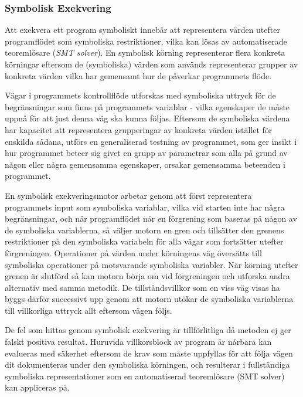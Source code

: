 \subsubsection{Symbolisk Exekvering}

Att exekvera ett program symboliskt innebär att representera värden utefter 
programflödet som symboliska restriktioner, vilka kan lösas av automatiserade 
teoremlösare (\emph{SMT solver}). En symbolisk körning representerar flera konkreta 
körningar eftersom de (symboliska) värden som används representerar grupper av 
konkreta värden vilka har gemensamt hur de påverkar programmets flöde. 

Vägar i programmets kontrollflöde utforskas med symboliska uttryck för de 
begränsningar som finns på programmets variablar - vilka egenskaper de måste uppnå 
för att just denna väg ska kunna följas. Eftersom de symboliska värdena har kapacitet 
att representera grupperingar av konkreta värden istället för enskilda sådana, 
utförs en generaliserad testning av programmet, som ger insikt i hur programmet 
beteer sig givet en grupp av parametrar som alla på grund av någon eller några 
gemensamma egenskaper, orsakar gemensamma beteenden i programmet. 

En symbolisk exekveringsmotor arbetar genom att först representera programmets input 
som symboliska variablar, vilka vid starten inte har några begränsningar, och när 
programflödet når en förgrening som baseras på någon av de symboliska variablerna, 
så väljer motorn en gren och tillsätter den grenens restriktioner på den symboliska 
variabeln för alla vägar som fortsätter utefter förgreningen. Operationer på värden 
under körningens väg översätts till symboliska operationer på motsvarande symboliska 
variabler. \cite{klee} När körning utefter grenen är slutförd så kan motorn börja om 
vid förgreningen och utforska andra alternativ med samma metodik. De tillståndsvillkor 
som en viss väg visas ha byggs därför successivt upp genom att motorn utökar de 
symboliska variablerna till villkorliga uttryck allt eftersom vägen följs. 

De fel som hittas genom symbolisk exekvering är tillförlitliga då metoden ej ger falskt 
positiva resultat. Huruvida villkorsblock av program är nårbara kan evalueras med 
säkerhet eftersom de krav som måste uppfyllas för att följa vägen dit dokumenteras under 
den symboliska körningen, och resulterar i fullständiga symboliska representationer 
som en automatiserad teoremlösare (SMT solver) kan appliceras på. 

